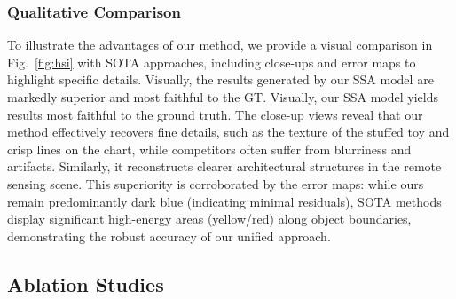 \subsubsection{Qualitative Comparison}
To illustrate the advantages of our method, we provide a visual comparison in Fig.~\ref{fig:hsi} with SOTA approaches, including close-ups and error maps to highlight specific details. Visually, the results generated by our SSA model are markedly superior and most faithful to the GT. 
Visually, our SSA model yields results most faithful to the ground truth. The close-up views reveal that our method effectively recovers fine details, such as the texture of the stuffed toy and crisp lines on the chart, while competitors often suffer from blurriness and artifacts. Similarly, it reconstructs clearer architectural structures in the remote sensing scene. This superiority is corroborated by the error maps: while ours remain predominantly dark blue (indicating minimal residuals), SOTA methods display significant high-energy areas (yellow/red) along object boundaries, demonstrating the robust accuracy of our unified approach.
\subsection{Ablation Studies}
\label{sec:ablation}


